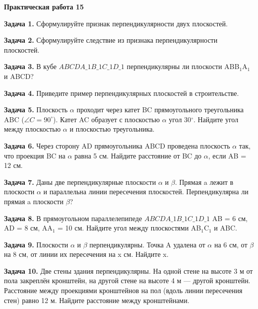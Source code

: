 \documentclass{umk-matematika}
\begin{document}
\begin{center}
{\Large\bfseries Практическая работа 15}
\end{center}
\vspace{0.5cm}

\textbf{Задача 1.} Сформулируйте признак перпендикулярности двух плоскостей.\par\vspace{10pt}
\textbf{Задача 2.} Сформулируйте следствие из признака перпендикулярности плоскостей.\par\vspace{10pt}
\textbf{Задача 3.} В кубе $ABCDA\_1B\_1C\_1D\_1$ перпендикулярны ли плоскости ABB$_1$A$_1$ и ABCD?\par\vspace{10pt}
\textbf{Задача 4.} Приведите пример перпендикулярных плоскостей в строительстве.\par\vspace{10pt}
\textbf{Задача 5.} Плоскость $\alpha$ проходит через катет BC прямоугольного треугольника ABC ($\angle C = 90^\circ$). Катет AC образует с плоскостью $\alpha$ угол 30$^\circ$. Найдите угол между плоскостью $\alpha$ и плоскостью треугольника.\par\vspace{10pt}
\textbf{Задача 6.} Через сторону AD прямоугольника ABCD проведена плоскость $\alpha$ так, что проекция BC на $\alpha$ равна 5 см. Найдите расстояние от BC до $\alpha$, если AB = 12 см.\par\vspace{10pt}
\textbf{Задача 7.} Даны две перпендикулярные плоскости $\alpha$ и $\beta$. Прямая a лежит в плоскости $\alpha$ и параллельна линии пересечения плоскостей. Перпендикулярна ли прямая a плоскости $\beta$?\par\vspace{10pt}
\textbf{Задача 8.} В прямоугольном параллелепипеде $ABCDA\_1B\_1C\_1D\_1$ AB = 6 см, AD = 8 см, AA$_1$ = 10 см. Найдите угол между плоскостями AB$_1$C$_1$ и ABC.\par\vspace{10pt}
\textbf{Задача 9.} Плоскости $\alpha$ и $\beta$ перпендикулярны. Точка A удалена от $\alpha$ на 6 см, от $\beta$ на 8 см, от линии их пересечения на x см. Найдите x.\par\vspace{10pt}
\textbf{Задача 10.} Две стены здания перпендикулярны. На одной стене на высоте 3 м от пола закреплён кронштейн, на другой стене на высоте 4 м — другой кронштейн. Расстояние между проекциями кронштейнов на пол (вдоль линии пересечения стен) равно 12 м. Найдите расстояние между кронштейнами.\par\vspace{10pt}
\newpage
\end{document}

